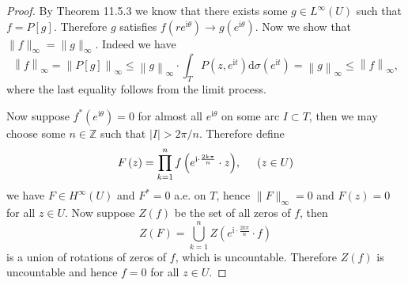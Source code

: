 \begin{proof}
By Theorem 11.5.3 we know that there exists some $g\in L^\infty(U)$ such that $f=P[g]$. Therefore $g$ satisfies $f(re^{\mathrm{i}\theta})\to g(e^{\mathrm{i}\theta})$. Now we show that $\|f\|_\infty=\|g\|_\infty$. Indeed we have 
$$
\left\| f \right\| _{\infty}=\left\| P\left[ g \right] \right\| _{\infty}\le \left\| g \right\| _{\infty}\cdot \int_T{P\left( z,e^{\mathrm{i}t} \right) \mathrm{d}\sigma \left( e^{\mathrm{i}t} \right)}=\left\| g \right\| _{\infty}\le \left\| f \right\| _{\infty},
$$
where the last equality follows from the limit process.\par
Now suppose $f^*(e^{\mathrm{i}\theta})=0$ for almost all $e^{\mathrm{i}\theta}$ on some arc $I\subset T$, then we may choose some $n\in\mathbb{Z}$ such that $|I|>2\pi/n$. Therefore define 
$$
F\left( z \right) =\prod_{k=1}^n{f\left( e^{\mathrm{i}\cdot \frac{2k\pi}{n}}\cdot z \right)},\hspace{0.5cm}\left( z\in U \right) 
$$
we have $F\in H^\infty(U)$ and $F^*=0$ a.e. on $T$, hence $\|F\|_\infty=0$ and $F(z)=0$ for all $z\in U$. Now suppose $Z(f)$ be the set of all zeros of $f$, then 
$$
Z\left( F \right) =\bigcup_{k=1}^n{Z\left( e^{\mathrm{i}\cdot \frac{2k\pi}{n}}\cdot f \right)}
$$
is a union of rotations of zeros of $f$, which is uncountable. Therefore $Z(f)$ is uncountable and hence $f=0$ for all $z\in U$.
\end{proof}
